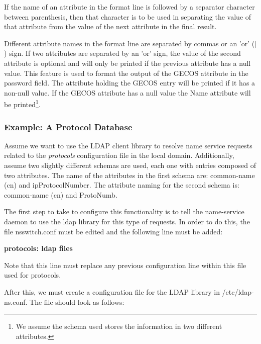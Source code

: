 If the name of an attribute in the format line is followed by a
separator character between parenthesis, then that character is to be
used in separating the value of that attribute from the value of the
next attribute in the final result.

Different attribute names in the format line are separated by commas
or an 'or' ($|$) sign. If two attributes are separated by an 'or'
sign, the value of the second attribute is optional and will only be
printed if the previous attribute has a null value. This
feature is used to format the output of the GECOS attribute in the
password field. The attribute holding the GECOS entry will be
printed if it has a non-null value. If the GECOS attribute has a null
value the Name attribute will be printed\footnote{ We assume the
schema used stores the information in two different attributes. }.

\subsubsection{Example: A Protocol Database}

Assume we want to use the LDAP client library to resolve name service 
requests related to the {\em protocols} configuration file in the local
domain. Additionally, assume two slightly different schemas are used,
each one with entries composed of two attributes. The name of the attributes
in the first schema are: common-name (cn) and ipProtocolNumber. The
attribute naming for the second schema is: common-name (cn) and
ProtoNumb. 

The first step to take to configure this functionality is to tell the 
name-service daemon to use the ldap library for this type of
requests. In order to do this, the file nsswitch.conf must be edited
and the following line  must be added:

\begin{center}
{\bf protocols:             ldap files}
\end{center}

Note that this line must replace any previous configuration line
within this file used for protocols.

After this, we must create a configuration file for the LDAP library in
/etc/ldap-ns.conf. The file should look as follows:

